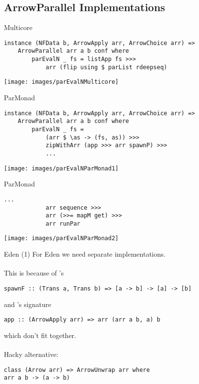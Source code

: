 \subsection{ArrowParallel Implementations}
\begin{frame}[fragile]{Multicore}
\begin{lstlisting}[frame=htrbl]
instance (NFData b, ArrowApply arr, ArrowChoice arr) =>
	ArrowParallel arr a b conf where
		parEvalN _ fs = listApp fs >>>
			arr (flip using $ parList rdeepseq)
\end{lstlisting}
\begin{center}
\texttt{[image: images/parEvalNMulticore]}
\end{center}
\end{frame}

\begin{frame}[fragile]{ParMonad}
\begin{lstlisting}[frame=htrbl]
instance (NFData b, ArrowApply arr, ArrowChoice arr) =>
	ArrowParallel arr a b conf where
		parEvalN _ fs = 
			(arr $ \as -> (fs, as)) >>>
			zipWithArr (app >>> arr spawnP) >>>
			...
\end{lstlisting}
\begin{center}
\texttt{[image: images/parEvalNParMonad1]}
\end{center}
\end{frame}

\begin{frame}[fragile]{ParMonad}
\begin{lstlisting}[frame=htrbl]
			...
			arr sequence >>>
			arr (>>= mapM get) >>>
			arr runPar
\end{lstlisting}
\begin{center}
\texttt{[image: images/parEvalNParMonad2]}
\end{center}
\end{frame}


\begin{frame}[fragile]{Eden (1)}
For Eden we need separate implementations.\\~\\
This is because of 's
\begin{lstlisting}[frame=htrbl]
spawnF :: (Trans a, Trans b) => [a -> b] -> [a] -> [b]
\end{lstlisting}
and 's signature
\begin{lstlisting}[frame=htrbl]
app :: (ArrowApply arr) => arr (arr a b, a) b
\end{lstlisting}
which don't fit together.\\~\\
\pause
Hacky alternative:
\begin{lstlisting}[frame=htrbl]
class (Arrow arr) => ArrowUnwrap arr where
arr a b -> (a -> b)
\end{lstlisting}
\end{frame}

